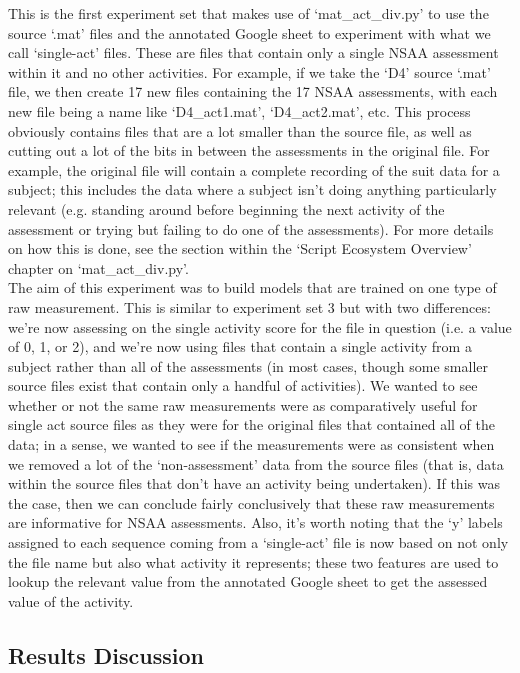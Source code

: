 \documentclass[12pt,twoside]{report}
\begin{document}
\quad This is the first experiment set that makes use of ‘mat\_act\_div.py’ to use the source ‘.mat’ files and the annotated Google sheet to experiment with what we call ‘single-act’ files. These are files that contain only a single NSAA assessment within it and no other activities. For example, if we take the ‘D4’ source ‘.mat’ file, we then create 17 new files containing the 17 NSAA assessments, with each new file being a name like ‘D4\_act1.mat’, ‘D4\_act2.mat’, etc. This process obviously contains files that are a lot smaller than the source file, as well as cutting out a lot of the bits in between the assessments in the original file. For example, the original file will contain a complete recording of the suit data for a subject; this includes the data where a subject isn’t doing anything particularly relevant (e.g. standing around before beginning the next activity of the assessment or trying but failing to do one of the assessments). For more details on how this is done, see the section within the ‘Script Ecosystem Overview’ chapter on ‘mat\_act\_div.py’.\\

\quad The aim of this experiment was to build models that are trained on one type of raw measurement. This is similar to experiment set 3 but with two differences: we’re now assessing on the single activity score for the file in question (i.e. a value of 0, 1, or 2), and we’re now using files that contain a single activity from a subject rather than all of the assessments (in most cases, though some smaller source files exist that contain only a handful of activities). We wanted to see whether or not the same raw measurements were as comparatively useful for single act source files as they were for the original files that contained all of the data; in a sense, we wanted to see if the measurements were as consistent when we removed a lot of the ‘non-assessment’ data from the source files (that is, data within the source files that don’t have an activity being undertaken). If this was the case, then we can conclude fairly conclusively that these raw measurements are informative for NSAA assessments. Also, it’s worth noting that the ‘y’ labels assigned to each sequence coming from a ‘single-act’ file is now based on not only the file name but also what activity it represents; these two features are used to lookup the relevant value from the annotated Google sheet to get the assessed value of the activity.


\subsection{Results Discussion}
\end{document}
